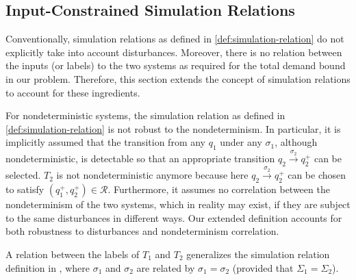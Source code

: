 \subsection{Input-Constrained Simulation Relations}
\label{sec:abstraction:ext-simulation}

Conventionally, simulation relations as defined in \cref{def:simulation-relation} do not explicitly take into account %
disturbances.  Moreover, there is no relation between the inputs (or labels) to the two systems as required for the total demand bound in our problem.  Therefore, this section extends the concept of simulation relations to account for these ingredients.

\begin{remark}
  For nondeterministic systems, the simulation relation as defined in
  \cref{def:simulation-relation} is not robust to the
  nondeterminism. In particular, it is implicitly assumed that the transition
  from any $q_1$ under any $\sigma_1$, although nondeterministic, is
  detectable so that an appropriate transition $q_2 \xrightarrow{\sigma_2}
  q^+_2$ can be selected. $T_2$ is not nondeterministic anymore because here
  $q_2 \xrightarrow{\sigma_2} q^+_2$ can be chosen to satisfy $(q_1^+, q_2^+)
  \in \mathcal{R}$. Furthermore, it assumes no correlation between the
  nondeterminism of the two systems, which in reality may exist, \eg
  if they are subject to the same disturbances in different ways.
  Our extended definition %
  accounts for both robustness to disturbances and nondeterminism correlation.
\end{remark}

\begin{remark}
  A relation between the labels of $T_1$ and $T_2$ generalizes the simulation
  relation definition in {\cite{girardetal07amd}}, where $\sigma_1$ and
  $\sigma_2$ are related by $\sigma_1 = \sigma_2$ (provided that $\Sigma_1 =
  \Sigma_2$).
\end{remark}

